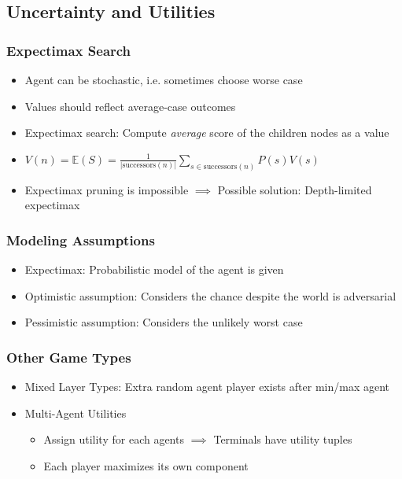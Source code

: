\subsection{Uncertainty and Utilities}

\subsubsection*{Expectimax Search}
\begin{itemize}
    \item Agent can be stochastic, i.e. sometimes choose worse case
    \item Values should reflect average-case outcomes
    \item Expectimax search: Compute \textit{average} score of the children nodes as a value
    \item $V(n)=\mathbb{E}(S)=\frac{1}{\lvert\text{successors}(n)\rvert}\sum_{s\in\text{successors}(n)}P(s)V(s)$
    \item Expectimax pruning is impossible $\implies$ Possible solution: Depth-limited expectimax
\end{itemize}

\subsubsection*{Modeling Assumptions}
\begin{itemize}
    \item Expectimax: Probabilistic model of the agent is given
    \item Optimistic assumption: Considers the chance despite the world is adversarial
    \item Pessimistic assumption: Considers the unlikely worst case
\end{itemize}

\subsubsection*{Other Game Types}
\begin{itemize}
    \item Mixed Layer Types: Extra random agent player exists after min/max agent
    \item Multi-Agent Utilities
    \begin{itemize}
        \item Assign utility for each agents $\implies$ Terminals have utility tuples
        \item Each player maximizes its own component
    \end{itemize}
\end{itemize}

